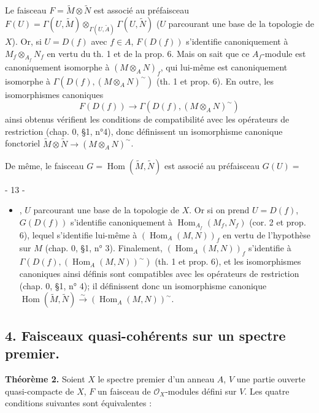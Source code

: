 Le faisceau $F = \tilde{M} \otimes \tilde{N}$ est associé au préfaisceau $F(U) = \Gamma(U, \tilde{M}) \otimes_{\Gamma(U, \tilde{A})} \Gamma(U, \tilde{N})$ ($U$ parcourant une base de la topologie de $X$). Or, si $U = D(f)$ avec $f \in A$, $F(D(f))$ s'identifie canoniquement à $M_f \otimes_{A_f} N_f$ en vertu du th. 1 et de la prop. 6. Mais on sait que ce $A_f$-module est canoniquement isomorphe à $(M \otimes_A N)_f$, qui lui-même est canoniquement isomorphe à $\Gamma(D(f), (M \otimes_A N)^{\sim})$ (th. 1 et prop. 6). En outre, les isomorphismes canoniques
$$ F(D(f)) \to \Gamma(D(f), (M \otimes_A N)^{\sim}) $$
ainsi obtenus vérifient les conditions de compatibilité avec les opérateurs de restriction (chap. 0, §1, n°4), donc définissent un isomorphisme canonique fonctoriel $\tilde{M} \otimes \tilde{N} \to (M \otimes_A N)^{\sim}$.

De même, le faisceau $G = \operatorname{Hom}(\tilde{M}, \tilde{N})$ est associé au préfaisceau $G(U) = $

\newpage


- 13 -

\begin{itemize}
    \item[$\operatorname{Hom}_{\mathcal{O}_U}(\tilde{M}|_U, \tilde{N}|_U)$], $U$ parcourant une base de la topologie de $X$. Or si on prend $U = D(f)$, $G(D(f))$ s'identifie canoniquement à $\operatorname{Hom}_{A_f}(M_f, N_f)$ (cor. 2 et prop. 6), lequel s'identifie lui-même à $(\operatorname{Hom}_A(M, N))_f$ en vertu de l'hypothèse sur $M$ (chap. 0, §1, n° 3). Finalement, $(\operatorname{Hom}_A(M, N))_f$ s'identifie à $\Gamma(D(f), (\operatorname{Hom}_A(M, N))^{\sim})$ (th. 1 et prop. 6), et les isomorphismes canoniques ainsi définis sont compatibles avec les opérateurs de restriction (chap. 0, §1, n° 4); il définissent donc un isomorphisme canonique $\operatorname{Hom}(\tilde{M}, \tilde{N}) \xrightarrow{\sim} (\operatorname{Hom}_A(M, N))^{\sim}$.
\end{itemize}

\subsection*{4. Faisceaux quasi-cohérents sur un spectre premier.}

\textbf{Théorème 2.} Soient $X$ le spectre premier d'un anneau $A$, $V$ une partie ouverte quasi-compacte de $X$, $F$ un faisceau de $\mathcal{O}_X$-modules défini sur $V$. Les quatre conditions suivantes sont équivalentes :

